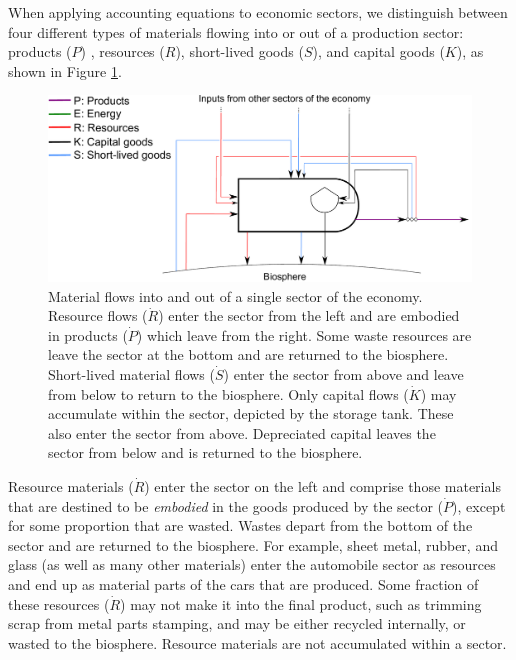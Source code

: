 When applying accounting equations to economic sectors,
we distinguish between four different types of
materials flowing into or out of a production sector: 
products ($P$) , 
resources ($R$),
short-lived goods ($S$),
and capital goods ($K$), 
as shown in Figure \ref{fig:PERKS_materials}.

\begin{figure}[h!]
\centering
\includegraphics[width=0.8\linewidth]{Part_1/Chapter_Materials/images/PERKS_basic_unit_materials.pdf}
\caption[Material flows into and out of a single sector of the economy.]{Material flows into and out of a single sector of the economy. Resource flows ($\dot{R}$) enter the sector from the left and are embodied in products ($\dot{P}$) which leave from the right. Some waste resources are leave the sector at the bottom and are returned to the biosphere. Short-lived material flows ($\dot{S}$) enter the sector from above and leave from below to return to the biosphere.  Only capital flows ($\dot{K}$) may accumulate within the sector, depicted by the storage tank. These also enter the sector from above. Depreciated capital leaves the sector from below and is returned to the biosphere.}
\label{fig:PERKS_materials}
\end{figure}

Resource materials ($\dot{R}$) 
enter the sector on the left 
and comprise those materials that are destined to be \emph{embodied} 
in the goods produced by the sector ($\dot{P}$), 
except for some proportion that are wasted.
Wastes depart from the bottom of the sector and are
returned to the biosphere. 
For example, sheet metal, rubber, and glass
(as well as many other materials) 
enter the automobile sector as resources 
and end up as material parts of the cars that are produced. 
Some fraction of these resources ($\dot{R}$) may not make it into the final product, 
such as trimming scrap from metal parts stamping, 
and may be either recycled internally, 
or wasted to the biosphere. 
Resource materials are not accumulated within a sector.

